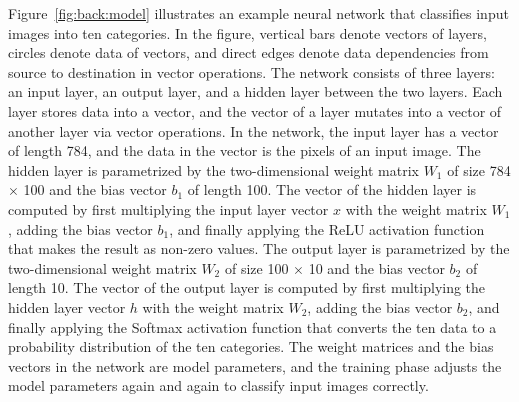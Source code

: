 Figure~\ref{fig:back:model} illustrates an example neural network that
classifies input images into ten categories.
In the figure, vertical bars denote vectors of layers, circles denote data of
vectors, and direct edges denote data dependencies from source to destination
in vector operations.
The network consists of three layers: an input layer, an output layer, and a
hidden layer between the two layers.
Each layer stores data into a vector, and the vector of a layer mutates into a
vector of another layer via vector operations.  
In the network, the input layer has a vector of length 784, and the data in the
vector is the pixels of an input image.
The hidden layer is parametrized by the two-dimensional weight matrix $W_1$ of
size 784 $\times$ 100 and the bias vector $b_1$ of length 100.
The vector of the hidden layer is computed by first multiplying the input layer
vector $x$ with the weight matrix $W_1$, adding the bias vector $b_1$, and
finally applying the ReLU activation function that makes the result as non-zero
values.
The output layer is parametrized by the two-dimensional weight matrix $W_2$ of
size 100 $\times$ 10 and the bias vector $b_2$ of length 10.
The vector of the output layer is computed by first multiplying the hidden
layer vector $h$ with the weight matrix $W_2$, adding the bias vector $b_2$,
and finally applying the Softmax activation function that converts the ten data
to a probability distribution of the ten categories.
The weight matrices and the bias vectors in the network are model parameters,
and the training phase adjusts the model parameters again and again to classify
input images correctly.

